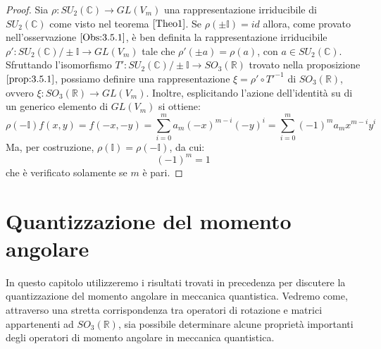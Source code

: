 \documentclass[12pt,a4paper]{report}
\theoremstyle{definition}
\theoremstyle{Theorem}
\theoremstyle{definition}
\theoremstyle{definition}
\theoremstyle{definition}
\begin{document}
\begin{proof}
	Sia $\rho:SU_2(\mathbb{C})\rightarrow GL(V_m)$ una rappresentazione irriducibile di $SU_2(\mathbb{C})$ come visto nel teorema $\ref{Theo1}$. Se $\rho(\pm\mathbb{I})=id$ allora, come provato nell'osservazione $\ref{Obs:3.5.1}$, è ben definita la rappresentazione irriducibile $\rho':SU_2(\mathbb{C})/\pm\mathbb{I}\rightarrow GL(V_m)$ tale che $\rho'(\pm a)=\rho(a)$, con $a\in SU_2(\mathbb{C})$. Sfruttando l'isomorfismo $T':SU_2(\mathbb{C})/\pm\mathbb{I}\rightarrow SO_3(\mathbb{R})$ trovato nella proposizione $\ref{prop:3.5.1}$, possiamo definire una rappresentazione $\xi=\rho'\circ T'^{-1}$ di $SO_3(\mathbb{R})$, ovvero $\xi:SO_3(\mathbb{R})\rightarrow GL(V_m)$.
	Inoltre, esplicitando l'azione dell'identità su di un generico elemento di $GL(V_m)$ si ottiene: $$\rho(-\mathbb{I})f(x,y)=f(-x,-y)=\sum_{i=0}^{m}a_m(-x)^{m-i}(-y)^i=\sum_{i=0}^{m}(-1)^ma_mx^{m-i}y^i$$
	Ma, per costruzione, $\rho(\mathbb{I})=\rho(-\mathbb{I})$, da cui:
	$$(-1)^m=1$$
	che è verificato solamente se $m$ è pari.
\end{proof}
\chapter{Quantizzazione del momento angolare}
In questo capitolo utilizzeremo i risultati trovati in precedenza per discutere la quantizzazione del momento angolare in meccanica quantistica. Vedremo come, attraverso una stretta corrispondenza tra operatori di rotazione e matrici appartenenti ad $SO_3(\mathbb{R})$, sia possibile determinare alcune proprietà importanti degli operatori di momento angolare in meccanica quantistica.
\end{document}
